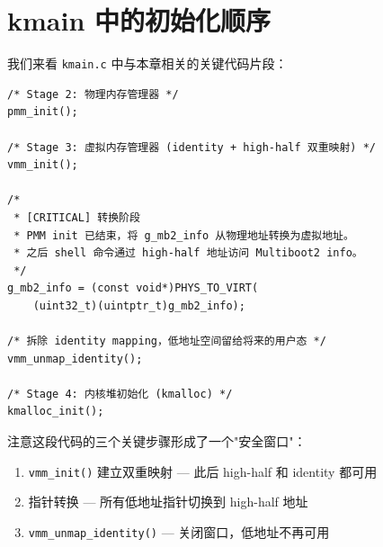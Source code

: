 \section{kmain 中的初始化顺序}

我们来看 \texttt{kmain.c} 中与本章相关的关键代码片段：

\begin{lstlisting}[style=cstyle, caption={kmain.c：high-half 切换的完整流程}]
/* Stage 2: 物理内存管理器 */
pmm_init();

/* Stage 3: 虚拟内存管理器 (identity + high-half 双重映射) */
vmm_init();

/*
 * [CRITICAL] 转换阶段
 * PMM init 已结束，将 g_mb2_info 从物理地址转换为虚拟地址。
 * 之后 shell 命令通过 high-half 地址访问 Multiboot2 info。
 */
g_mb2_info = (const void*)PHYS_TO_VIRT(
    (uint32_t)(uintptr_t)g_mb2_info);

/* 拆除 identity mapping，低地址空间留给将来的用户态 */
vmm_unmap_identity();

/* Stage 4: 内核堆初始化 (kmalloc) */
kmalloc_init();
\end{lstlisting}

注意这段代码的三个关键步骤形成了一个"安全窗口"：

\begin{enumerate}
  \item \texttt{vmm\_init()} 建立双重映射 — 此后 high-half 和 identity 都可用
  \item 指针转换 — 所有低地址指针切换到 high-half 地址
  \item \texttt{vmm\_unmap\_identity()} — 关闭窗口，低地址不再可用
\end{enumerate}



